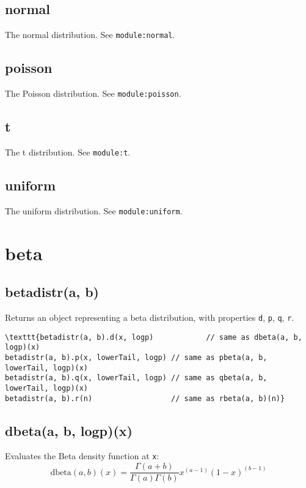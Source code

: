 \documentclass{article}
\begin{document}
    \subsection*{normal}
    The normal distribution. See \texttt{module:normal}.


    \subsection*{poisson}
    The Poisson distribution. See \texttt{module:poisson}.


    \subsection*{t}
    The t distribution. See \texttt{module:t}.


    \subsection*{uniform}
    The uniform distribution. See \texttt{module:uniform}.


  \section{beta}
    \subsection*{betadistr(a, b)}
    Returns an object representing a beta distribution, with properties \texttt{d}, \texttt{p}, \texttt{q}, \texttt{r}.


\begin{lstlisting}
\texttt{betadistr(a, b).d(x, logp)            // same as dbeta(a, b, logp)(x)
betadistr(a, b).p(x, lowerTail, logp) // same as pbeta(a, b, lowerTail, logp)(x)
betadistr(a, b).q(x, lowerTail, logp) // same as qbeta(a, b, lowerTail, logp)(x)
betadistr(a, b).r(n)                  // same as rbeta(a, b)(n)}\end{lstlisting}

    \subsection*{dbeta(a, b, logp)(x)}
    Evaluates the Beta density function at \texttt{x}:
$$\textrm{dbeta}(a,b)(x) = \frac{\Gamma(a+b)}{\Gamma(a)\Gamma(b)}x^{(a-1)}(1-x)^{(b-1)}$$
\end{document}
